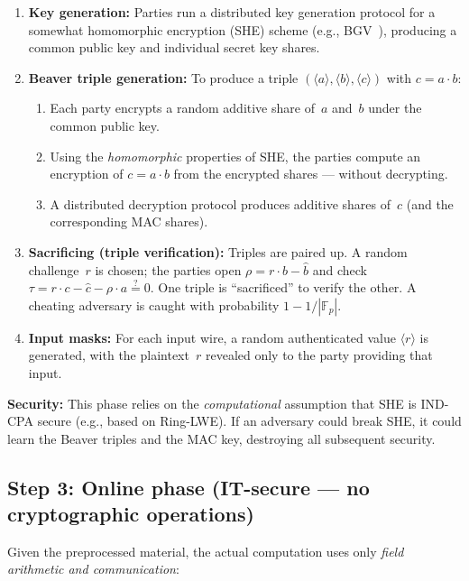 \documentclass{article}
\begin{document}
\begin{enumerate}
  \item \textbf{Key generation:} Parties run a distributed key generation protocol for a somewhat homomorphic encryption (SHE) scheme (e.g., BGV~\cite{BGV2014}), producing a common public key and individual secret key shares.
  \item \textbf{Beaver triple generation:} To produce a triple $(\langle a \rangle, \langle b \rangle, \langle c \rangle)$ with $c = a \cdot b$:
  \begin{enumerate}
    \item Each party encrypts a random additive share of~$a$ and~$b$ under the common public key.
    \item Using the \emph{homomorphic} properties of SHE, the parties compute an encryption of $c = a \cdot b$ from the encrypted shares --- without decrypting.
    \item A distributed decryption protocol produces additive shares of~$c$ (and the corresponding MAC shares).
  \end{enumerate}
  \item \textbf{Sacrificing (triple verification):} Triples are paired up. A random challenge~$r$ is chosen; the parties open $\rho = r \cdot b - \hat{b}$ and check $\tau = r \cdot c - \hat{c} - \rho \cdot a \stackrel{?}{=} 0$. One triple is ``sacrificed'' to verify the other. A cheating adversary is caught with probability $1 - 1/|\mathbb{F}_p|$.
  \item \textbf{Input masks:} For each input wire, a random authenticated value $\langle r \rangle$ is generated, with the plaintext~$r$ revealed only to the party providing that input.
\end{enumerate}

\noindent\textbf{Security:} This phase relies on the \emph{computational} assumption that SHE is IND-CPA secure (e.g., based on Ring-LWE). If an adversary could break SHE, it could learn the Beaver triples and the MAC key, destroying all subsequent security.

\subsection*{Step 3: Online phase (IT-secure --- no cryptographic operations)}

Given the preprocessed material, the actual computation uses only \emph{field arithmetic and communication}:
\end{document}
